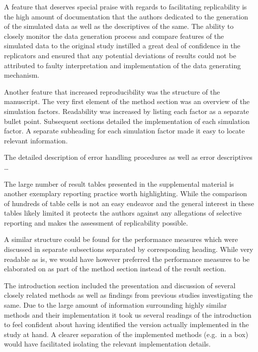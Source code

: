 \documentclass[10,a4paperpaper,]{article}
\begin{document}
A feature that deserves special praise with regards to facilitating
replicability is the high amount of documentation that the authors
dedicated to the generation of the simulated data as well as the
descriptives of the same. The ability to closely monitor the data
generation process and compare features of the simulated data to the
original study instilled a great deal of confidence in the replicators
and ensured that any potential deviations of results could not be
attributed to faulty interpretation and implementation of the data
generating mechanism.

Another feature that increased reproducibility was the structure of the
manuscript. The very first element of the method section was an overview
of the simulation factors. Readability was increased by listing each
factor as a separate bullet point. Subsequent sections detailed the
implementation of each simulation factor. A separate subheading for each
simulation factor made it easy to locate relevant information.

The detailed description of error handling procedures as well as error
descriptives \ldots{}

The large number of result tables presented in the supplemental material
is another exemplary reporting practice worth highlighting. While the
comparison of hundreds of table cells is not an easy endeavor and the
general interest in these tables likely limited it protects the authors
against any allegations of selective reporting and makes the assessment
of replicability possible.

A similar structure could be found for the performance measures which
were discussed in separate subsections separated by corresponding
heading. While very readable as is, we would have however preferred the
performance measures to be elaborated on as part of the method section
instead of the result section.

The introduction section included the presentation and discussion of
several closely related methods as well as findings from previous
studies investigating the same. Due to the large amount of information
surrounding highly similar methods and their implementation it took us
several readings of the introduction to feel confident about having
identified the version actually implemented in the study at hand. A
clearer separation of the implemented methods (e.g.~in a box) would have
facilitated isolating the relevant implementation details.
\end{document}
